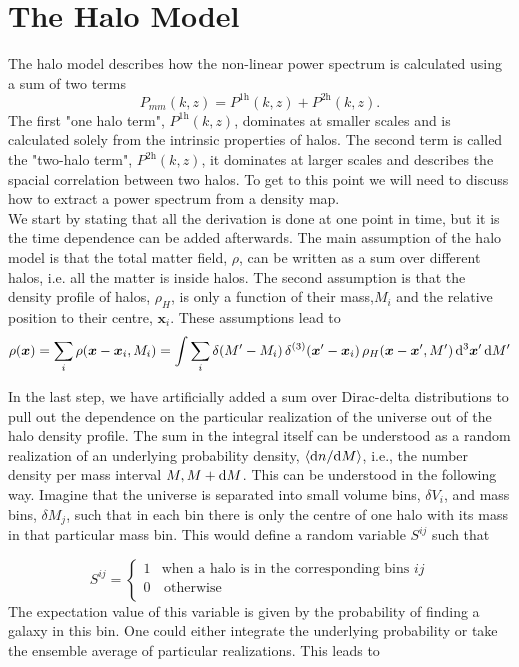 \documentclass[../main.tex]{subfiles}
\begin{document}
\section{The Halo Model}\label{sec:halo_model}
The halo model describes how the non-linear power spectrum is calculated using a sum of two terms 
\begin{equation}
    P_{mm}(k,z) = P^\mathrm{1h}(k,z) + P^\mathrm{2h}(k,z).
\end{equation}
The first "one halo term", $P^\mathrm{1h}(k,z)$, dominates at smaller scales and is calculated solely from the intrinsic properties of halos. The second term is called the "two-halo term", $P^\mathrm{2h}(k,z)$, it dominates at larger scales and describes the spacial correlation between two halos. To get to this point we will need to discuss how to extract a power spectrum from a density map.\\
We start by stating that all the derivation is done at one point in time, but it is the time dependence can be added afterwards.
The main assumption of the halo model is that the total matter field, $\rho$, can be written as a sum over different halos, i.e. all the matter is inside halos. 
The second assumption is that the density profile of halos, $\rho_H$, is only a function of their mass,$M_i$ and the relative position to their centre, $\boldsymbol{x}_i$. These assumptions lead to 
\begin{equation}
\label{eq:halo_denisity_field}
\rho(\boldsymbol{x}) = \sum_i \rho(\boldsymbol{x}-\boldsymbol{x}_i,M_i)=\int \sum_i \delta(M'-M_i)\,\delta^{(3)}(\boldsymbol{x}'-\boldsymbol{x}_i)\,\rho_H(\boldsymbol{x}-\boldsymbol{x}',M')\, \mathrm{d}^3 \boldsymbol{x}' \, \mathrm{d} M'
\end{equation}

In the last step, we have artificially added a sum over Dirac-delta distributions to pull out the dependence on the particular realization of the universe out of the halo density profile. The sum in the integral itself can be understood as a random realization of an underlying probability density, $\langle \mathrm{d} n/\mathrm{d} M \rangle$, i.e., the number density per mass interval $M,M+\mathrm{d} M$. This can be understood in the following way. Imagine that the universe is separated into small volume bins, $\delta V_i$, and mass bins, $\delta M_j$, such that in each bin there is only the centre of one halo with its mass in that particular mass bin. This would define a random variable $S^{ij}$ such that 

\begin{equation*}
S^{ij} = \left\{ \begin{array}{ll}
    1 & \text{when a halo is in the corresponding bins } ij \\
    0 & \, \textrm{otherwise} \\
    \end{array}  \right.    
\end{equation*}
The expectation value of this variable is given by the probability of finding a galaxy in this bin. One could either integrate the underlying probability or take the ensemble average of particular realizations. This leads to
\end{document}
